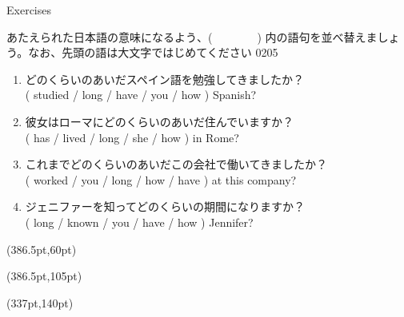 \documentclass[aspectratio=169,xcolor={dvipsnames,table}]{beamer}
\newcommand{\myaudio}[1]{\href{#1}{\faVolumeUp}}
\begin{document}
\begin{frame}[plain]{Exercises}

{\small あたえられた日本語の意味になるよう、(~~~~~~~~) 内の語句を並べ替えましょう。なお、先頭の語は大文字ではじめてください}%
\hfill{\tiny 0205}\,{\scriptsize \myaudio{./audio/012_have_pp_keizoku_11.mp3}}

\vspace{-5pt}

\begin{enumerate}
 \item どのくらいのあいだスペイン語を勉強してきましたか？\\
( studied / long / have / you / how ) Spanish?\\
 \item 彼女はローマにどのくらいのあいだ住んでいますか？\\
( has / lived / long / she / how ) in Rome?\\
 \item これまでどのくらいのあいだこの会社で働いてきましたか？\\
( worked /  you / long / how / have ) at this company?\\
 \item ジェニファーを知ってどのくらいの期間になりますか？\\
( long / known / you / have / how ) Jennifer?\\
\end{enumerate}

\begin{textblock*}{0.4\linewidth}(386.5pt,60pt)
\end{textblock*}

\begin{textblock*}{0.4\linewidth}(386.5pt,105pt)
\end{textblock*}

\begin{textblock*}{0.4\linewidth}(337pt,140pt)
\end{textblock*}
\end{frame}
\end{document}
